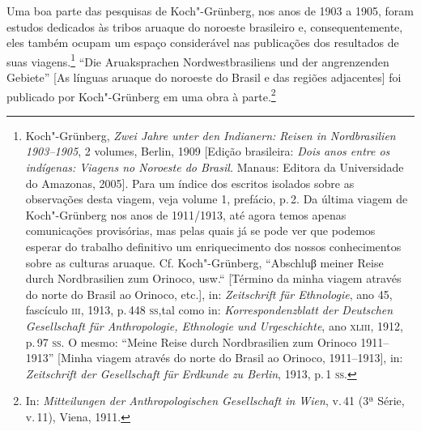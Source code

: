 Uma boa parte das pesquisas de Koch"-Grünberg, nos anos de 1903 a 1905,
foram estudos dedicados às tribos aruaque do noroeste brasileiro e,
consequentemente, eles também ocupam um espaço considerável nas
publicações dos resultados de suas viagens.\footnote{Koch"-Grünberg,
  \textit{Zwei Jahre unter den Indianern: Reisen in Nordbrasilien
  1903--1905}, 2 volumes, Berlin, 1909 {[}Edição brasileira: \textit{Dois
  anos entre os indígenas: Viagens no Noroeste do Brasil.} Manaus:
  Editora da Universidade do Amazonas, 2005{]}. Para um índice dos
  escritos isolados sobre as observações desta viagem, veja volume 1,
  prefácio, p.\,2. Da última viagem de Koch"-Grünberg nos anos de
  1911/1913, até agora temos apenas comunicações provisórias, mas pelas
  quais já se pode ver que podemos esperar do trabalho definitivo um
  enriquecimento dos nossos conhecimentos sobre as culturas aruaque. Cf.
  Koch"-Grünberg, ``Abschluβ meiner Reise durch Nordbrasilien zum
  Orinoco, usw.`` {[}Término da minha viagem através do norte do Brasil
  ao Orinoco, etc.{]}, in: \textit{Zeitschrift für Ethnologie}, ano 45,
  fascículo \textsc{iii}, 1913, p.\,448 \textsc{ss},tal como in: \textit{Korrespondenzblatt
  der Deutschen Gesellschaft für Anthropologie, Ethnologie und
  Urgeschichte}, ano \textsc{xliii}, 1912, p.\,97 \textsc{ss}. O mesmo: ``Meine Reise durch
  Nordbrasilien zum Orinoco 1911--1913'' {[}Minha viagem através do norte
  do Brasil ao Orinoco, 1911--1913{]}, in: \textit{Zeitschrift der
  Gesellschaft für Erdkunde zu Berlin}, 1913, p.\,1 \textsc{ss}.} ``Die
Aruaksprachen Nordwestbrasiliens und der angrenzenden Gebiete'' {[}As
línguas aruaque do noroeste do Brasil e das regiões adjacentes{]} foi
publicado por Koch"-Grünberg em uma obra à parte.\footnote{In:
  \textit{Mitteilungen der Anthropologischen Gesellschaft in Wien}, v.\,41
  (3ª Série, v.\,11), Viena, 1911.}

